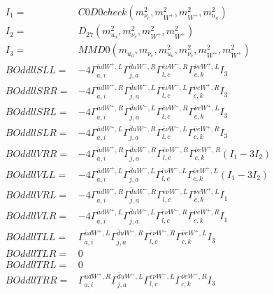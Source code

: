 \documentclass[A4,landscape]{article}
\begin{document}
\begin{align} 
I_1 = & C0D0check(m^2_{\nu_{{c}}}, m^2_{W^+}, m^2_{W^+}, m^2_{u_{{a}}}) \\ 
I_2 = & D_{27}(m^2_{u_{{a}}}, m^2_{\nu_{{c}}}, m^2_{W^+}, m^2_{W^+}) \\ 
I_3 = & MMD0(m_{u_{{a}}}, m_{\nu_{{c}}}, m^2_{u_{{a}}}, m^2_{\nu_{{c}}}, m^2_{W^+}, m^2_{W^+}) \\ 
  BOddllSLL= & -4  \Gamma^{\bar{u}d W^+ ,L}_{a, i} \Gamma^{\bar{d}u W^-,R}_{j, a} \Gamma^{\bar{e}\nu W^-,R}_{l, c} \Gamma^{\bar{\nu}e W^+ ,L}_{c, k} I_3 \\ 
  BOddllSRR= & -4  \Gamma^{\bar{u}d W^+ ,R}_{a, i} \Gamma^{\bar{d}u W^-,L}_{j, a} \Gamma^{\bar{e}\nu W^-,L}_{l, c} \Gamma^{\bar{\nu}e W^+ ,R}_{c, k} I_3 \\ 
  BOddllSRL= & -4  \Gamma^{\bar{u}d W^+ ,R}_{a, i} \Gamma^{\bar{d}u W^-,L}_{j, a} \Gamma^{\bar{e}\nu W^-,R}_{l, c} \Gamma^{\bar{\nu}e W^+ ,L}_{c, k} I_3 \\ 
  BOddllSLR= & -4  \Gamma^{\bar{u}d W^+ ,L}_{a, i} \Gamma^{\bar{d}u W^-,R}_{j, a} \Gamma^{\bar{e}\nu W^-,L}_{l, c} \Gamma^{\bar{\nu}e W^+ ,R}_{c, k} I_3 \\ 
  BOddllVRR= & -4  \Gamma^{\bar{u}d W^+ ,R}_{a, i} \Gamma^{\bar{d}u W^-,R}_{j, a} \Gamma^{\bar{e}\nu W^-,R}_{l, c} \Gamma^{\bar{\nu}e W^+ ,R}_{c, k} (I_1 - 3 I_2) \\ 
  BOddllVLL= & -4  \Gamma^{\bar{u}d W^+ ,L}_{a, i} \Gamma^{\bar{d}u W^-,L}_{j, a} \Gamma^{\bar{e}\nu W^-,L}_{l, c} \Gamma^{\bar{\nu}e W^+ ,L}_{c, k} (I_1 - 3 I_2) \\ 
  BOddllVRL= & -4  \Gamma^{\bar{u}d W^+ ,R}_{a, i} \Gamma^{\bar{d}u W^-,R}_{j, a} \Gamma^{\bar{e}\nu W^-,L}_{l, c} \Gamma^{\bar{\nu}e W^+ ,L}_{c, k} I_1 \\ 
  BOddllVLR= & -4  \Gamma^{\bar{u}d W^+ ,L}_{a, i} \Gamma^{\bar{d}u W^-,L}_{j, a} \Gamma^{\bar{e}\nu W^-,R}_{l, c} \Gamma^{\bar{\nu}e W^+ ,R}_{c, k} I_1 \\ 
  BOddllTLL= &  \Gamma^{\bar{u}d W^+ ,L}_{a, i} \Gamma^{\bar{d}u W^-,R}_{j, a} \Gamma^{\bar{e}\nu W^-,R}_{l, c} \Gamma^{\bar{\nu}e W^+ ,L}_{c, k} I_3 \\ 
  BOddllTLR= & 0 \\ 
  BOddllTRL= & 0 \\ 
  BOddllTRR= &  \Gamma^{\bar{u}d W^+ ,R}_{a, i} \Gamma^{\bar{d}u W^-,L}_{j, a} \Gamma^{\bar{e}\nu W^-,L}_{l, c} \Gamma^{\bar{\nu}e W^+ ,R}_{c, k} I_3 \\ 
\end{align} 
\end{document}
